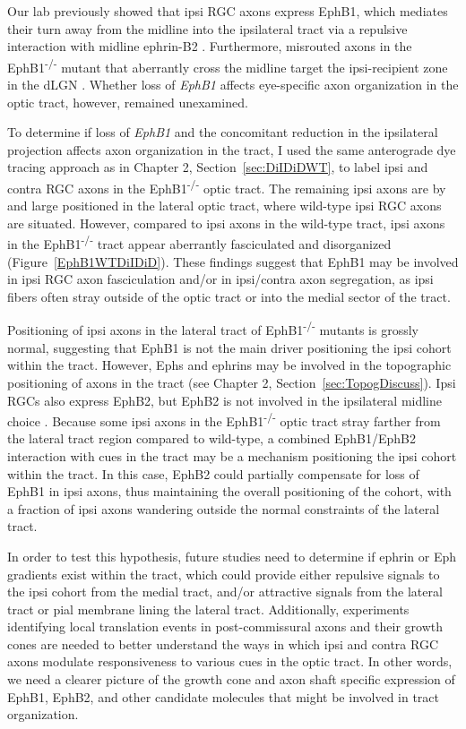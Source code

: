 Our lab previously showed that ipsi RGC axons express EphB1, which mediates their turn away from the midline into the ipsilateral tract via a repulsive interaction with midline ephrin-B2 \cite{williams2003ephrin,petros2009specificity}.
Furthermore, misrouted axons in the EphB1\textsuperscript{-/-} mutant that aberrantly cross the midline target the ipsi-recipient zone in the dLGN \cite{rebsam2009switching}.
Whether loss of \emph{EphB1} affects eye-specific axon organization in the optic tract, however, remained unexamined.

To determine if loss of \emph{EphB1} and the concomitant reduction in the ipsilateral projection affects axon organization in the tract, I used the same anterograde dye tracing approach as in Chapter 2, Section~\ref{sec:DiIDiDWT}, to label ipsi and contra RGC axons in the EphB1\textsuperscript{-/-} optic tract.
The remaining ipsi axons are by and large positioned in the lateral optic tract, where wild-type ipsi RGC axons are situated.
However, compared to ipsi axons in the wild-type tract, ipsi axons in the EphB1\textsuperscript{-/-} tract appear aberrantly fasciculated and disorganized (Figure~\ref{EphB1WTDiIDiD}).
These findings suggest that EphB1 may be involved in ipsi RGC axon fasciculation and/or in ipsi/contra axon segregation, as ipsi fibers often stray outside of the optic tract or into the medial sector of the tract.

Positioning of ipsi axons in the lateral tract of EphB1\textsuperscript{-/-} mutants is grossly normal, suggesting that EphB1 is not the main driver positioning the ipsi cohort within the tract.
However, Ephs and ephrins may be involved in the topographic positioning of axons in the tract (see Chapter 2, Section~\ref{sec:TopogDiscuss}).
Ipsi RGCs also express EphB2, but EphB2 is not involved in the ipsilateral midline choice \cite{williams2003ephrin,chenaux2011forward}.
Because some ipsi axons in the EphB1\textsuperscript{-/-} optic tract stray farther from the lateral tract region compared to wild-type, a combined EphB1/EphB2 interaction with cues in the tract may be a mechanism positioning the ipsi cohort within the tract.
In this case, EphB2 could partially compensate for loss of EphB1 in ipsi axons, thus maintaining the overall positioning of the cohort, with a fraction of ipsi axons wandering outside the normal constraints of the lateral tract.

In order to test this hypothesis, future studies need to determine if ephrin or Eph gradients exist within the tract, which could provide either repulsive signals to the ipsi cohort from the medial tract, and/or attractive signals from the lateral tract or pial membrane lining the lateral tract.
Additionally, experiments identifying local translation events in post-commissural axons and their growth cones are needed to better understand the ways in which ipsi and contra RGC axons modulate responsiveness to various cues in the optic tract.
In other words, we need a clearer picture of the growth cone and axon shaft specific expression of EphB1, EphB2, and other candidate molecules that might be involved in tract organization.

